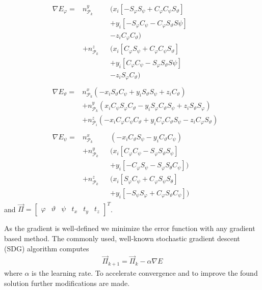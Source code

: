 \begin{align}
    &\begin{alignedat}{3}
        \nabla E_\varphi = &n_{\mathcal{P}_k}^y&&(x_i[-S_\varphi S_\psi+C_\varphi C_\psi S_\vartheta] \\&&&+y_i[-S_\varphi C_\psi -C_\varphi S_\vartheta S\psi] \\&&&- z_i C_\varphi C_\vartheta)\\
        &+ n_{\mathcal{P}_k}^z&&(x_i[C_\varphi S_\psi+C_\varphi C_\psi S_\vartheta] \\&&&+y_i[C_\varphi C_\psi -S_\varphi S_\vartheta S\psi] \\&&&- z_i S_\varphi C_\vartheta)
    \end{alignedat} \\
    &\begin{alignedat}{3}
        \nabla E_\vartheta = & n_{\mathcal{P}_k}^x(-x_iS_\vartheta C_\psi + y_i S_\vartheta S_\psi + z_iC_\vartheta) \\
        &+ n_{\mathcal{P}_k}^y(x_iC_\psi S_\varphi C_\vartheta - y_iS_\varphi C_\vartheta S_\psi + z_i S_\vartheta S_\varphi)  \\
        &+ n_{\mathcal{P}_i}^z(-x_iC_\varphi C_\psi C_\vartheta + y_iC_\varphi C_\vartheta S_\psi - z_i C_\varphi S_\vartheta)
    \end{alignedat}\\
    &\begin{alignedat}{3}
       \nabla E_\psi =& n_{\mathcal{P}_k}^x&&\left(-x_iC_\vartheta S_\psi - y_iC_\vartheta C_\psi\right) \\
       &+ n_{\mathcal{P}_k}^y&&(x_i[C_\varphi C_\psi - S_\varphi S_\vartheta S_\psi] \\
       &&&+ y_i[-C_\varphi S_\psi - S_\varphi S_\theta C_\psi]) \\
       &+ n_{\mathcal{P}_k}^z&&(x_i[S_\varphi C_\psi + C_\varphi S_\psi S_\theta] \\
       &&&+ y_i[-S_\psi S_ \varphi + C_\varphi S_\vartheta C_\psi]) 
    \end{alignedat}
\end{align}
and $\vec{\Pi}=\begin{bmatrix}\varphi & \vartheta & \psi & t_x & t_y & t_z\end{bmatrix}^T$.

As the gradient is well-defined we minimize the error function with any gradient based method. 
The commonly used, well-known stochastic gradient descent (SDG) algorithm computes 
\begin{align}
    \vec{\Pi}_{k+1} = \vec{\Pi}_{k} - \alpha \nabla E
\end{align}
where $\alpha$ is the learning rate.
To accelerate convergence and to improve the found solution further modifications are made.

